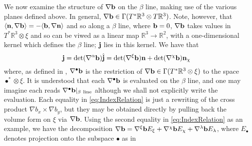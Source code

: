 We now examine the structure of $\nabla \mathbf{b}$ on the $\beta$ line, making use of the various planes defined above. In general, $\nabla \mathbf{b} \in \Gamma(T^*\mathbb{R}^3 \otimes T\mathbb{R}^3)$. Note, however, that $\langle \mathbf{n}, \nabla \mathbf{b} \rangle = - \langle \mathbf{b} , \nabla \mathbf{n} \rangle$ and so along a $\beta$ line, where $\mathbf{b}=0$, $\nabla \mathbf{b}$ takes values in $T^*\mathbb{R}^3 \otimes \xi$ and so can be viwed as a linear map $\mathbb{R}^3 \rightarrow \mathbb{R}^2$, with a one-dimensional kernel which defines the $\beta$ line; $\mathbf{j}$ lies in this kernel. We have that 
\begin{equation}
    \mathbf{j} = \mathrm{det}(\nabla^{\alpha} \mathbf{b}) \hat{\mathbf{j}} = \mathrm{det}(\nabla^\xi \mathbf{b}) \mathbf{n} + \mathrm{det}(\nabla^\chi \mathbf{b}) \mathbf{n}_\chi
\label{eq:IndexRelation}
\end{equation}
where, as defined in \s{\ref{subsec:Geometry}}, $\nabla^\bullet \mathbf{b}$ is the restriction of $\nabla \mathbf{b} \in \Gamma(T^*\mathbb{R}^3 \otimes \xi) $ to the space $\bullet^* \otimes \xi$. It is understood that each $\nabla^\bullet \mathbf{b}$ is evaluated on the $\beta$ line, and one may imagine each reads $\nabla^\bullet \w b |_{\beta\ \mathrm{line}}$ although we shall not explicitly write the evaluation. Each equality in \eqref{eq:IndexRelation} is just a rewriting of the cross product $\nabla b_x \times \nabla b_y$, but they may be obtained directly by pulling back the volume form on $\xi$ via $\nabla \mathbf{b}$. Using the second equality  in \eqref{eq:IndexRelation} as an example, we have the decomposition $\nabla \mathbf{b} = \nabla^\xi \mathbf{b} E_\xi + \nabla^\chi \mathbf{b} E_\chi+ \nabla^\lambda \mathbf{b} E_\lambda$, where $E_\bullet$ denotes projection onto the subspace $\bullet$ as in 
